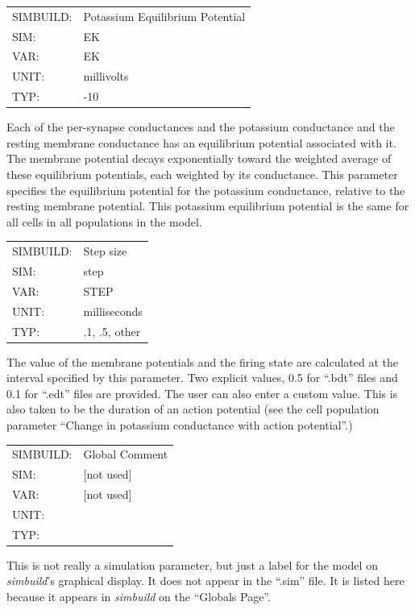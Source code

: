 \documentclass[12pt,openany,oneside]{book}
\newcommand{\prog}[1]{\textit{{#1}}}
\newcommand{\ext}[1]{{{``.#1''}}}
\newcommand{\inquotes}[1]{{{``#1''}}}
\begin{document}
\begin{flushleft}
\begin{tabular}{@{}ll@{}}
SIMBUILD: & Potassium Equilibrium Potential\\
SIM: & EK\\
VAR: & EK\\
UNIT: & millivolts\\
TYP: & -10\\
\end{tabular}
\end{flushleft}
\noindent
Each of the per-synapse conductances and the potassium conductance and
the resting membrane conductance has an equilibrium potential
associated with it. The membrane potential decays exponentially
toward the weighted average of these equilibrium potentials, each
weighted by its conductance. This parameter specifies the equilibrium
potential for the potassium conductance, relative to the resting
membrane potential. This potassium equilibrium potential is the same
for all cells in all populations in the model.
\filbreak
\vspace{\baselineskip}

\begin{flushleft}
\begin{tabular}{@{}ll@{}}
\label{Simulation step size in milliseconds}
SIMBUILD: & Step size\\
SIM: & step\\
VAR: & STEP\\
UNIT: & milliseconds\\
TYP: & .1, .5, other\\
\end{tabular}
\end{flushleft}
\noindent
The value of the membrane potentials and the firing state are
calculated at the interval specified by this parameter. Two explicit 
values, 0.5 for \ext{bdt} files and 0.1 for \ext{edt} files are provided. The
user can also enter a custom value. This is also
taken to be the duration of an action potential (see the cell
population parameter \inquotes{Change in potassium conductance with action
potential}.)  
\filbreak
\vspace{\baselineskip}

\begin{flushleft}
\begin{tabular}{@{}ll@{}}
SIMBUILD: & Global Comment\\
SIM: & [not used]\\
VAR: & [not used]\\
UNIT: &\\
TYP: &\\
\end{tabular}
\end{flushleft}
\noindent
This is not really a simulation parameter, but just a label for the
model on \prog{simbuild}'s graphical display. It does not appear in the
\ext{sim} file. It is listed here because it appears in \prog{simbuild} on the
\inquotes{Globals Page}.
\filbreak
\vspace{\baselineskip}
\end{document}
